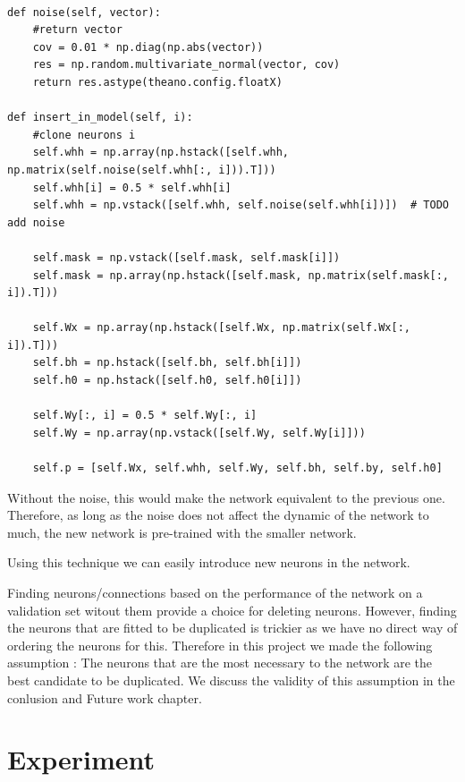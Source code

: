 \begin{verbatim}

def noise(self, vector):
    #return vector
    cov = 0.01 * np.diag(np.abs(vector))
    res = np.random.multivariate_normal(vector, cov)
    return res.astype(theano.config.floatX)

def insert_in_model(self, i):
    #clone neurons i
    self.whh = np.array(np.hstack([self.whh, np.matrix(self.noise(self.whh[:, i])).T])) 
    self.whh[i] = 0.5 * self.whh[i]  
    self.whh = np.vstack([self.whh, self.noise(self.whh[i])])  # TODO add noise

    self.mask = np.vstack([self.mask, self.mask[i]])
    self.mask = np.array(np.hstack([self.mask, np.matrix(self.mask[:, i]).T]))

    self.Wx = np.array(np.hstack([self.Wx, np.matrix(self.Wx[:, i]).T])) 
    self.bh = np.hstack([self.bh, self.bh[i]]) 
    self.h0 = np.hstack([self.h0, self.h0[i]])

    self.Wy[:, i] = 0.5 * self.Wy[:, i]  
    self.Wy = np.array(np.vstack([self.Wy, self.Wy[i]])) 

    self.p = [self.Wx, self.whh, self.Wy, self.bh, self.by, self.h0]

\end{verbatim}

Without the noise, this would make the network equivalent to the previous one. Therefore, as long as the noise does not affect the dynamic of the network to much, the new network is pre-trained with the smaller network.

Using this technique we can easily introduce new neurons in the network.

Finding neurons/connections based on the performance of the network on a validation set witout them provide a choice for deleting neurons. However, finding the neurons that are fitted to be duplicated is trickier as we have no direct way of ordering the neurons for this. Therefore in this project we made the following assumption : The neurons that are the most necessary to the network are the best candidate to be duplicated. We discuss the validity of this assumption in the conlusion and Future work chapter.  


\section{Experiment}

